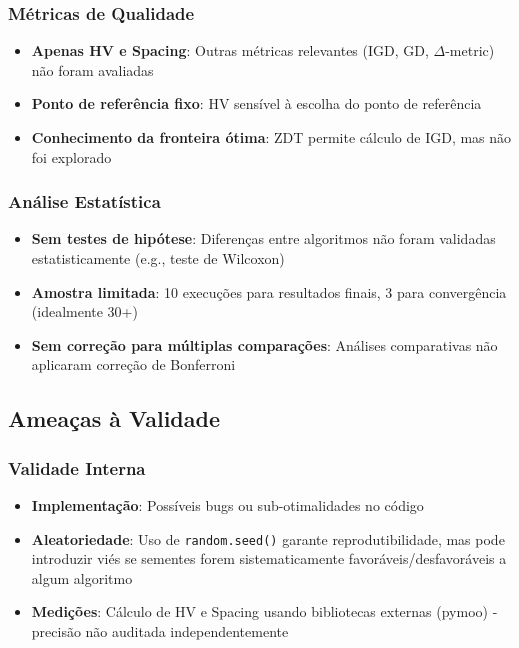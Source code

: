 \subsubsection{Métricas de Qualidade}

\begin{itemize}
    \item \textbf{Apenas HV e Spacing}: Outras métricas relevantes (IGD, GD, $\Delta$-metric) não foram avaliadas
    \item \textbf{Ponto de referência fixo}: HV sensível à escolha do ponto de referência
    \item \textbf{Conhecimento da fronteira ótima}: ZDT permite cálculo de IGD, mas não foi explorado
\end{itemize}

\subsubsection{Análise Estatística}

\begin{itemize}
    \item \textbf{Sem testes de hipótese}: Diferenças entre algoritmos não foram validadas estatisticamente (e.g., teste de Wilcoxon)
    \item \textbf{Amostra limitada}: 10 execuções para resultados finais, 3 para convergência (idealmente 30+)
    \item \textbf{Sem correção para múltiplas comparações}: Análises comparativas não aplicaram correção de Bonferroni
\end{itemize}

\subsection{Ameaças à Validade}

\subsubsection{Validade Interna}

\begin{itemize}
    \item \textbf{Implementação}: Possíveis bugs ou sub-otimalidades no código
    \item \textbf{Aleatoriedade}: Uso de \texttt{random.seed()} garante reprodutibilidade, mas pode introduzir viés se sementes forem sistematicamente favoráveis/desfavoráveis a algum algoritmo
    \item \textbf{Medições}: Cálculo de HV e Spacing usando bibliotecas externas (pymoo) - precisão não auditada independentemente
\end{itemize}

